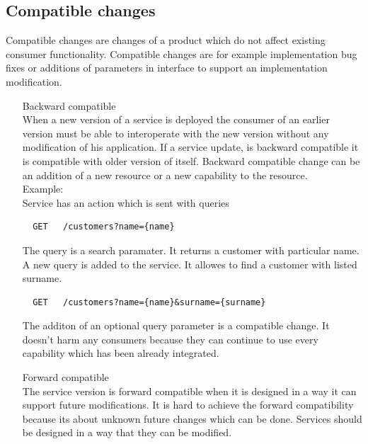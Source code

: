 \subsection{Compatible changes}
  Compatible changes are changes of a product which do not affect existing consumer functionality. Compatible changes are for example implementation bug fixes or additions of parameters in interface to support an implementation modification.
  \begin{enumerate}
    \item[Backward compatible] \hfill \\ 
  When a new version of a service is deployed the consumer of an earlier version must be able to interoperate with the new version without any modification of his application. If a service update, is backward compatible it is compatible with older version of itself. Backward compatible change can be an addition of a new resource or a new capability to the resource. \hfill \\ 
  Example: \hfill \\ 
  Service has an action which is sent with \gls{queries} \hfill \\ 
  \begin{lstlisting}
  GET   /customers?name={name}
  \end{lstlisting}
  The query is a search paramater. It returns a customer with particular name. A new query is added to the service. It allowes to find a customer with listed surname. 
  \begin{lstlisting}
  GET   /customers?name={name}&surname={surname}
  \end{lstlisting}

  The additon of an optional query parameter is a compatible change. It doesn't harm any consumers because they can continue to use every capability which has been already integrated.
  
  \item[Forward compatible] \hfill \\
  The service version is forward compatible when it is designed in a way it can support future modifications. It is hard to achieve the forward compatibility because its about unknown future changes which can be done. Services should be designed in a way that they can be modified.
  \end{enumerate}
  

